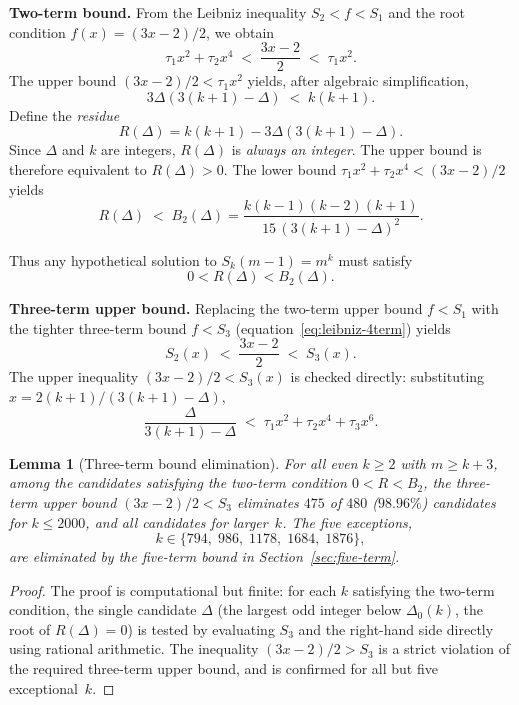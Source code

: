\documentclass[12pt,a4paper]{article}
\theoremstyle{plain}
\newtheorem{lemma}[theorem]{Lemma}
\theoremstyle{definition}
\begin{document}
\medskip
\noindent\textbf{Two-term bound.}
From the Leibniz inequality $S_2 < f < S_1$ and the root condition
$f(x) = (3x-2)/2$, we obtain
\[
  \tau_1 x^2 + \tau_2 x^4 \; < \; \frac{3x-2}{2} \; < \; \tau_1 x^2.
\]
The upper bound $(3x-2)/2 < \tau_1 x^2$ yields, after algebraic
simplification,
\[
  3\Delta(3(k+1)-\Delta) \; < \; k(k+1).
\]
Define the \emph{residue}
\begin{equation}\label{eq:R-def}
  R(\Delta) = k(k+1) - 3\Delta(3(k+1)-\Delta).
\end{equation}
Since $\Delta$ and $k$ are integers, $R(\Delta)$ is \emph{always an
integer}.  The upper bound is therefore equivalent to $R(\Delta) > 0$.
The lower bound $\tau_1 x^2 + \tau_2 x^4 < (3x-2)/2$ yields
\begin{equation}\label{eq:B2-bound}
  R(\Delta) \; < \; B_2(\Delta)
  = \frac{k(k-1)(k-2)(k+1)}{15\,(3(k+1)-\Delta)^2}.
\end{equation}

Thus any hypothetical solution to $S_k(m-1) = m^k$ must satisfy
\begin{equation}\label{eq:two-term-condition}
  \boxed{0 < R(\Delta) < B_2(\Delta)}.
\end{equation}

\medskip
\noindent\textbf{Three-term upper bound.}
Replacing the two-term upper bound $f < S_1$ with the tighter three-term
bound $f < S_3$ (equation~\eqref{eq:leibniz-4term}) yields
\[
  S_2(x) \; < \; \frac{3x-2}{2} \; < \; S_3(x).
\]
The upper inequality $(3x-2)/2 < S_3(x)$ is checked directly:
substituting $x = 2(k+1)/(3(k+1)-\Delta)$,
\[
  \frac{\Delta}{3(k+1)-\Delta}
  \; < \;
  \tau_1 x^2 + \tau_2 x^4 + \tau_3 x^6.
\]

\begin{lemma}[Three-term bound elimination]\label{lem:three-term}
  For all even $k \ge 2$ with $m \ge k+3$, among the candidates
  satisfying the two-term condition $0 < R < B_2$, the three-term upper
  bound $(3x-2)/2 < S_3$ eliminates $475$ of $480$ ($98.96\%$)
  candidates for $k \le 2000$, and all candidates for larger~$k$.
  The five exceptions,
  \[
    k \in \{794,\; 986,\; 1178,\; 1684,\; 1876\},
  \]
  are eliminated by the five-term bound in
  Section~\ref{sec:five-term}.
\end{lemma}

\begin{proof}
  The proof is computational but finite: for each $k$ satisfying the
  two-term condition, the single candidate $\Delta$ (the largest odd
  integer below $\Delta_0(k)$, the root of $R(\Delta)=0$) is tested by
  evaluating $S_3$ and the right-hand side directly using rational
  arithmetic.  The inequality $(3x-2)/2 > S_3$ is a strict violation
  of the required three-term upper bound, and is confirmed for all but
  five exceptional~$k$.
\end{proof}
\end{document}
